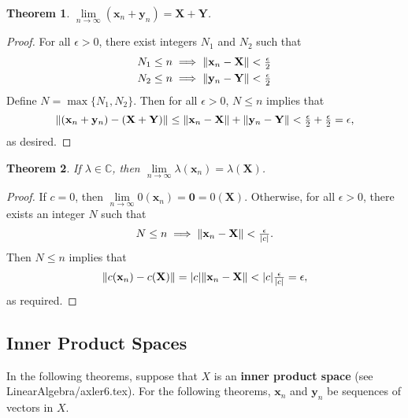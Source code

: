 \documentclass[11pt]{article}
\renewcommand{\vec}[1]{\mathbf{#1}}
\newtheorem{theorem}{Theorem}
\begin{document}
\newpage

\begin{theorem}
	$\lim\limits_{n \to \infty} (\vec{x}_{n} + \vec{y}_{n}) = \vec{X} + \vec{Y}$.
\end{theorem}
\begin{adjustwidth}{0.5cm}{}
	\begin{proof}
		For all $\epsilon > 0$, there exist integers $N_{1}$ and $N_{2}$ such that
		\begin{align*}
			N_{1} \le n & \implies \norm{\vec{x}_{n} - \vec{X}} < \tfrac{\epsilon}{2} \\
			N_{2} \le n & \implies \norm{\vec{y}_{n} - \vec{Y}} < \tfrac{\epsilon}{2}
		\end{align*}
		Define $N = \max \{ N_{1}, N_{2} \}$. Then for all $\epsilon > 0$, $N \le n$ implies that
		\[
			\norm{(\vec{x}_{n} + \vec{y}_{n}) - (\vec{X} + \vec{Y})} \le \norm{\vec{x}_{n} - \vec{X}} + \norm{\vec{y}_{n} - \vec{Y}} < \tfrac{\epsilon}{2} + \tfrac{\epsilon}{2} = \epsilon,
		\]
		as desired.
	\end{proof}
\end{adjustwidth}

\begin{theorem}
	If $\lambda \in \mathbb{C}$, then $\lim\limits_{n \to \infty} \lambda (\vec{x}_{n}) = \lambda (\vec{X})$.
\end{theorem}
\begin{adjustwidth}{0.5cm}{}
	\begin{proof}
		If $c = 0$, then $\lim\limits_{n \to \infty} 0 (\vec{x}_{n}) = \vec{0} = 0 (\vec{X})$. Otherwise, for all $\epsilon > 0$, there exists an integer $N$ such that
		\[
			N \le n \implies \norm{\vec{x}_{n} - \vec{X}} < \tfrac{\epsilon}{\abs{c}}.
		\]
		Then $N \le n$ implies that
		\[
			\norm{c(\vec{x}_{n}) - c(\vec{X})} = \abs{c} \norm{\vec{x}_{n} - \vec{X}} < \abs{c} \tfrac{\epsilon}{\abs{c}} = \epsilon,
		\]
		as required.
	\end{proof}
\end{adjustwidth}


\subsection{Inner Product Spaces}

In the following theorems, suppose that $X$ is an \textbf{inner product space} (see LinearAlgebra/axler6.tex). For the following theorems, $\vec{x}_{n}$ and $\vec{y}_{n}$ be sequences of vectors in $X$.
\end{document}
